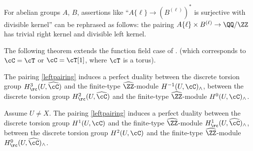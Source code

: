 \begin{rema}
For abelian groups $A$, $B$, assertions like ``$A \{\ell\} \to
(B^{(\ell)}) ^*$ is surjective with divisible kernel'' can be rephrased
as follows: the pairing $A \{\ell\} \times B^{(\ell)} \to \QQ/\ZZ$
has trivial right kernel and divisible left kernel.
\end{rema}

The following theorem extends the function field case of
\cite[Th.\,II.4.6]{MilADT}. (which corresponds to $\cC=\cT$ or
$\cC=\cT[1]$, where $\cT$ is a torus).

\skpt
\begin{theo} \label{refin2}
\begin{enumeratea}
\item\label{refin2a}
The pairing \eqref{leftpairing}
induces a perfect duality between the discrete torsion group
$H^3_\rc(U,\widehat \cC)$ and the finite-type $\widehat \ZZ$-module
$H^{-1}(U,\cC)_{\wedge}$, \resp between
the discrete torsion group
$H^2_\rc(U,\widehat \cC)$ and the finite-type $\widehat \ZZ$-module
$H^0(U,\cC)_{\wedge}$.

\item\label{refin2b}
Assume $U \neq X$. The pairing \eqref{leftpairing}
induces a perfect duality between the discrete torsion group
$H^1(U,\cC)$
and the finite-type $\widehat \ZZ$-module
$H^1_\rc(U,\widehat \cC)_{\wedge}$, \resp between
the discrete torsion group
$H^2(U,\cC)$ and the finite-type $\widehat \ZZ$-module
$H^0_\rc(U,\widehat \cC)_{\wedge}$.
\end{enumeratea}
\end{theo}

